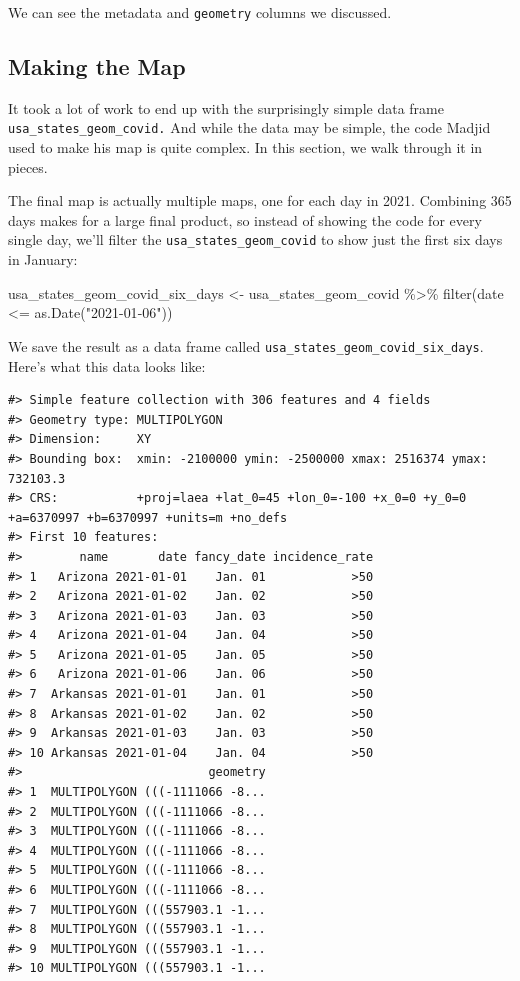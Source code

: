 \documentclass[
]{book}
\newenvironment{Shaded}{\begin{snugshade}}{\end{snugshade}}
\newcommand{\FunctionTok}[1]{\textcolor[rgb]{0.00,0.00,0.00}{#1}}
\newcommand{\NormalTok}[1]{#1}
\newcommand{\OtherTok}[1]{\textcolor[rgb]{0.56,0.35,0.01}{#1}}
\newcommand{\SpecialCharTok}[1]{\textcolor[rgb]{0.00,0.00,0.00}{#1}}
\newcommand{\StringTok}[1]{\textcolor[rgb]{0.31,0.60,0.02}{#1}}
\begin{document}
We can see the metadata and \texttt{geometry} columns we discussed.

\hypertarget{making-the-map}{%
\subsection*{Making the Map}\label{making-the-map}}

It took a lot of work to end up with the surprisingly simple data frame \texttt{usa\_states\_geom\_covid.} And while the data may be simple, the code Madjid used to make his map is quite complex. In this section, we walk through it in pieces.

The final map is actually multiple maps, one for each day in 2021. Combining 365 days makes for a large final product, so instead of showing the code for every single day, we'll filter the \texttt{usa\_states\_geom\_covid} to show just the first six days in January:

\begin{Shaded}
\begin{Highlighting}[]
\NormalTok{usa\_states\_geom\_covid\_six\_days }\OtherTok{\textless{}{-}}\NormalTok{ usa\_states\_geom\_covid }\SpecialCharTok{\%\textgreater{}\%}
  \FunctionTok{filter}\NormalTok{(date }\SpecialCharTok{\textless{}=} \FunctionTok{as.Date}\NormalTok{(}\StringTok{"2021{-}01{-}06"}\NormalTok{))}
\end{Highlighting}
\end{Shaded}

We save the result as a data frame called \texttt{usa\_states\_geom\_covid\_six\_days}. Here's what this data looks like:

\begin{verbatim}
#> Simple feature collection with 306 features and 4 fields
#> Geometry type: MULTIPOLYGON
#> Dimension:     XY
#> Bounding box:  xmin: -2100000 ymin: -2500000 xmax: 2516374 ymax: 732103.3
#> CRS:           +proj=laea +lat_0=45 +lon_0=-100 +x_0=0 +y_0=0 +a=6370997 +b=6370997 +units=m +no_defs
#> First 10 features:
#>        name       date fancy_date incidence_rate
#> 1   Arizona 2021-01-01    Jan. 01            >50
#> 2   Arizona 2021-01-02    Jan. 02            >50
#> 3   Arizona 2021-01-03    Jan. 03            >50
#> 4   Arizona 2021-01-04    Jan. 04            >50
#> 5   Arizona 2021-01-05    Jan. 05            >50
#> 6   Arizona 2021-01-06    Jan. 06            >50
#> 7  Arkansas 2021-01-01    Jan. 01            >50
#> 8  Arkansas 2021-01-02    Jan. 02            >50
#> 9  Arkansas 2021-01-03    Jan. 03            >50
#> 10 Arkansas 2021-01-04    Jan. 04            >50
#>                          geometry
#> 1  MULTIPOLYGON (((-1111066 -8...
#> 2  MULTIPOLYGON (((-1111066 -8...
#> 3  MULTIPOLYGON (((-1111066 -8...
#> 4  MULTIPOLYGON (((-1111066 -8...
#> 5  MULTIPOLYGON (((-1111066 -8...
#> 6  MULTIPOLYGON (((-1111066 -8...
#> 7  MULTIPOLYGON (((557903.1 -1...
#> 8  MULTIPOLYGON (((557903.1 -1...
#> 9  MULTIPOLYGON (((557903.1 -1...
#> 10 MULTIPOLYGON (((557903.1 -1...
\end{verbatim}
\end{document}
